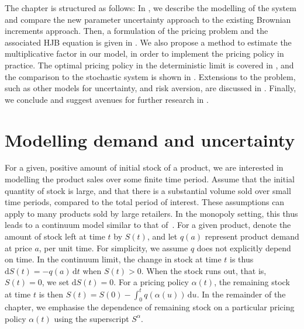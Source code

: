 \documentclass[main.tex]{subfiles}
\begin{document}
The chapter is structured as follows: In , we
describe the modelling of the system and compare the new parameter uncertainty
approach to the existing Brownian increments approach.
Then, a formulation of the pricing problem and the associated HJB
equation is given in . We also propose
a method to estimate the multiplicative factor in our model, in
order to implement the pricing policy in practice.
The optimal pricing policy in the deterministic limit is covered in
, and the comparison to the stochastic
system is shown in .
Extensions to the problem, such as other models for uncertainty, and
risk aversion, are discussed in .
Finally, we conclude and
suggest avenues for further research in .

\section{Modelling demand and uncertainty}\label{sec:modelling}
For a given, positive amount of initial stock of a product, we are interested in
modelling the product sales over some finite time period.
Assume that the initial quantity of stock is large, and that there is a
substantial volume sold over small time periods, compared to the total
period of interest. These assumptions can apply to many products sold
by large retailers. In the monopoly setting, this thus leads to
a continuum model similar to that of~\citet{kalish1983monopolist}.
For a given product, denote the amount of stock left at time $t$ by $S(t)$,
and let $q(a)$ represent product demand at price $a$, per unit
time.
For simplicity, we assume $q$ does not explicitly depend on time.
In the continuum limit, the change in  stock at time $t$
is thus $\mathrm{d}S(t)=-q(a)\,\mathrm{d}t$ when $S(t)>0$. When the
stock runs out, that is, $S(t)=0$, we set $\mathrm{d}S(t)=0$.
For a pricing policy
$\alpha(t)$, the remaining stock at time $t$ is then
$S(t)=S(0)-\int_0^tq(\alpha(u))\,\mathrm{d}u$. In the remainder of the chapter,
we emphasise the dependence of remaining stock on a particular
pricing policy $\alpha(t)$ using the superscript $S^\alpha$.
\end{document}
